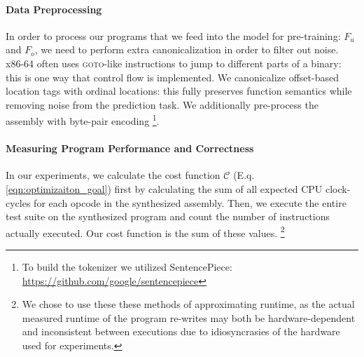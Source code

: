 \documentclass{article}
\begin{document}
\paragraph{Data Preprocessing} In order to process our programs that we feed into the model for pre-training: $F_u$ and $F_o$, we need to perform extra canonicalization in order to filter out noise. x86-64 often uses \textsc{goto}-like instructions to jump to different parts of a binary: this is one way that control flow is implemented. We canonicalize offset-based location tags with ordinal locations: this fully preserves function semantics while removing noise from the prediction task. We additionally pre-process the assembly with byte-pair encoding \citep{sennrich2015neural} \footnote{To build the tokenizer we utilized SentencePiece: \url{https://github.com/google/sentencepiece}}. 


\paragraph{Measuring Program Performance and Correctness} 
In our experiments, we calculate the cost function $\mathcal{C}$ (E.q. \ref{eqn:optimizaiton_goal}) first by calculating the sum of all expected CPU clock-cycles for each opcode in the synthesized assembly. 
Then, we execute the entire test suite on the synthesized program and count the number of instructions actually executed. Our cost function is the sum of these values.%
\footnote{We chose to use these these methods of approximating runtime, as the actual measured runtime of the program re-writes may both be hardware-dependent and inconsistent between executions due to idiosyncrasies of the hardware used for experiments.} 


\end{document}
